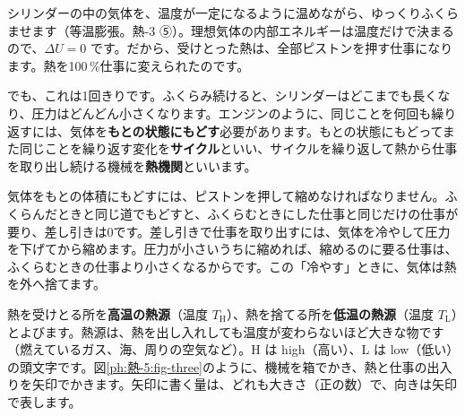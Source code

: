 
\label{ph:熱-5:sec1}
シリンダーの中の気体を、温度が一定になるように温めながら、ゆっくりふくらませます（等温膨張。熱-3 ⑤）。理想気体の内部エネルギーは温度だけで決まるので、$\Delta U=0$ です。だから、受けとった熱は、全部ピストンを押す仕事になります。熱を100\,\%仕事に変えられたのです。

でも、これは1回きりです。ふくらみ続けると、シリンダーはどこまでも長くなり、圧力はどんどん小さくなります。エンジンのように、同じことを何回も繰り返すには、気体を\textbf{もとの状態にもどす}必要があります。もとの状態にもどってまた同じことを繰り返す変化を\textbf{サイクル}といい、サイクルを繰り返して熱から仕事を取り出し続ける機械を\textbf{熱機関}といいます。

気体をもとの体積にもどすには、ピストンを押して縮めなければなりません。ふくらんだときと同じ道でもどすと、ふくらむときにした仕事と同じだけの仕事が要り、差し引きは0です。差し引きで仕事を取り出すには、気体を冷やして圧力を下げてから縮めます。圧力が小さいうちに縮めれば、縮めるのに要る仕事は、ふくらむときの仕事より小さくなるからです。この「冷やす」ときに、気体は熱を外へ捨てます。

熱を受けとる所を\textbf{高温の熱源}（温度 $T_{\mathrm H}$）、熱を捨てる所を\textbf{低温の熱源}（温度 $T_{\mathrm L}$）とよびます。熱源は、熱を出し入れしても温度が変わらないほど大きな物です（燃えているガス、海、周りの空気など）。H は high（高い）、L は low（低い）の頭文字です。図\ref{ph:熱-5:fig-three}のように、機械を箱でかき、熱と仕事の出入りを矢印でかきます。矢印に書く量は、どれも大きさ（正の数）で、向きは矢印で表します。

